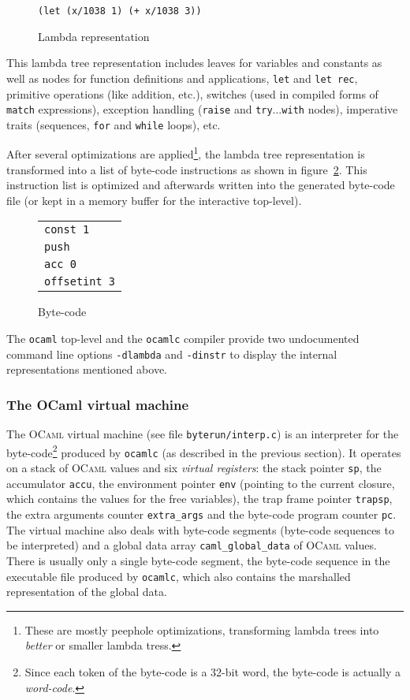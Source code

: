\documentclass[10pt,a4paper,twocolumn]{article}
\begin{document}
\begin{figure}[ht]
  \centering
  \texttt{(let (x/1038 1) (+ x/1038 3))}
  \caption{Lambda representation}
  \label{figure:Lambda_representation}
\end{figure}

This lambda tree representation includes leaves for variables and constants as well as nodes for function
definitions and applications, \texttt{let} and \texttt{let rec}, primitive operations (like addition, etc.),
switches (used in compiled forms of \texttt{match} expressions), exception handling (\texttt{raise}
and \texttt{try$\ldots$with} nodes), imperative traits (sequences, \texttt{for} and \texttt{while}
loops), etc.

After several optimizations are applied\footnote{These are mostly peephole optimizations, transforming
  lambda trees into {\em better} or smaller lambda tress.}, the lambda tree representation is
transformed into a list of byte-code instructions as shown in figure~\ref{figure:Byte_code}.
This instruction list is optimized and afterwards written into the generated byte-code file
(or kept in a memory buffer for the interactive top-level).

\begin{figure}[ht]
  \centering
  \begin{tabular}{l}
    \texttt{const 1} \\
    \texttt{push} \\
    \texttt{acc 0} \\
    \texttt{offsetint 3}
  \end{tabular}
  \caption{Byte-code}
  \label{figure:Byte_code}
\end{figure}

The \texttt{ocaml} top-level and the \texttt{ocamlc} compiler provide two undocumented command
line options \texttt{-dlambda} and \texttt{-dinstr} to display the internal representations
mentioned above.

\subsubsection{The OCaml virtual machine}

The \textsc{OCaml} virtual machine (see file \texttt{byterun/interp.c}) is an interpreter for the
byte-code\footnote{Since each token of the byte-code is a 32-bit word, the byte-code is actually
  a \emph{word-code}.} produced by \texttt{ocamlc} (as described in the previous section). It operates on a 
stack of \textsc{OCaml} values and six \emph{virtual registers}: the stack pointer \texttt{sp},
the accumulator \texttt{accu}, the environment pointer \texttt{env} (pointing to the current
closure, which contains the values for the free variables), the trap frame pointer \texttt{trapsp},
the extra arguments counter \texttt{extra\_args} and the byte-code program counter \texttt{pc}.
The virtual machine also deals with byte-code segments (byte-code sequences to be interpreted)
and a global data array \texttt{caml\_global\_data} of \textsc{OCaml} values. There is usually
only a single byte-code segment, the byte-code sequence in the executable file produced by
\texttt{ocamlc}, which also contains the marshalled representation of the global data.
\end{document}
